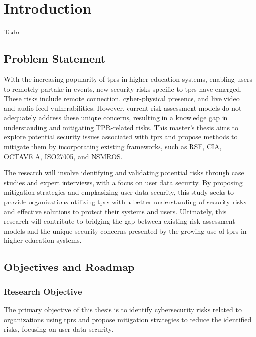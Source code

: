 
\newpage
\section{Introduction}

Todo

\subsection{Problem Statement}

With the increasing popularity of \ac{tprs} in higher education systems, enabling users to remotely partake in events, new security risks specific to \ac{tprs} have emerged.
These risks include remote connection, cyber-physical presence, and live video and audio feed vulnerabilities.
However, current risk assessment models do not adequately address these unique concerns, resulting in a knowledge gap in understanding and mitigating TPR-related risks.
This master's thesis aims to explore potential security issues associated with \ac{tprs} and propose methods to mitigate them by incorporating existing frameworks, such as RSF, CIA, OCTAVE A, ISO27005, and NSMROS.

The research will involve identifying and validating potential risks through case studies and expert interviews, with a focus on user data security.
By proposing mitigation strategies and emphasizing user data security, this study seeks to provide organizations utilizing \ac{tprs} with a better understanding of security risks and effective solutions to protect their systems and users.
Ultimately, this research will contribute to bridging the gap between existing risk assessment models and the unique security concerns presented by the growing use of \ac{tprs} in higher education systems.

\subsection{Objectives and Roadmap}\label{subsec:objectives-and-roadmap}


\subsubsection{Research Objective}

The primary objective of this thesis is to identify cybersecurity risks related to organizations using \ac{tprs} and propose mitigation strategies to reduce the identified risks, focusing on user data security.

